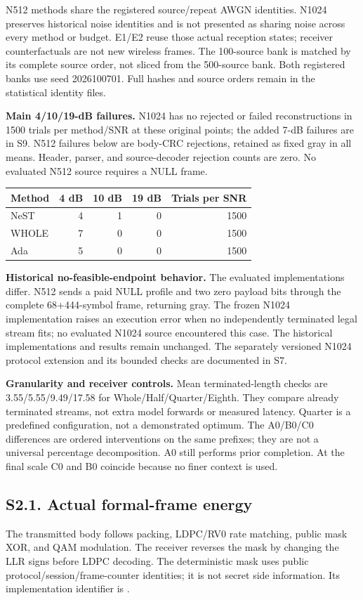 \documentclass[11pt,letterpaper]{article}
\begin{document}
N512 methods share the registered source/repeat AWGN identities. N1024 preserves historical noise identities and is not presented as sharing noise across every method or budget. E1/E2 reuse those actual reception states; receiver counterfactuals are not new wireless frames. The 100-source bank is matched by its complete source order, not sliced from the 500-source bank. Both registered banks use seed 2026100701. Full hashes and source orders remain in the statistical identity files.

\textbf{Main 4/10/19-dB failures.} N1024 has no rejected or failed reconstructions in 1500 trials per method/SNR at these original points; the added 7-dB failures are in S9. N512 failures below are body-CRC rejections, retained as fixed gray in all means. Header, parser, and source-decoder rejection counts are zero. No evaluated N512 source requires a NULL frame.
\begin{center}\begin{tabular}{lrrrr}\toprule
Method & 4 dB & 10 dB & 19 dB & Trials per SNR\\\midrule
NeST & 4 & 1 & 0 & 1500\\
WHOLE & 7 & 0 & 0 & 1500\\
Ada & 5 & 0 & 0 & 1500\\\bottomrule
\end{tabular}\end{center}
\textbf{Historical no-feasible-endpoint behavior.} The evaluated implementations differ. N512 sends a paid NULL profile and two zero payload bits through the complete 68+444-symbol frame, returning gray. The frozen N1024 implementation raises an execution error when no independently terminated legal stream fits; no evaluated N1024 source encountered this case. The historical implementations and results remain unchanged. The separately versioned N1024 protocol extension and its bounded checks are documented in S7.

\textbf{Granularity and receiver controls.} Mean terminated-length checks are 3.55/5.55/9.49/17.58 for Whole/Half/Quarter/Eighth. They compare already terminated streams, not extra model forwards or measured latency. Quarter is a predefined configuration, not a demonstrated optimum. The A0/B0/C0 differences are ordered interventions on the same prefixes; they are not a universal percentage decomposition. A0 still performs prior completion. At the final scale C0 and B0 coincide because no finer context is used.


\clearpage\subsection*{S2.1. Actual formal-frame energy}
The transmitted body follows packing, LDPC/RV0 rate matching, public mask XOR, and QAM modulation. The receiver reverses the mask by changing the LLR signs before LDPC decoding. The deterministic mask uses public protocol/session/frame-counter identities; it is not secret side information. Its implementation identifier is
.
\end{document}
